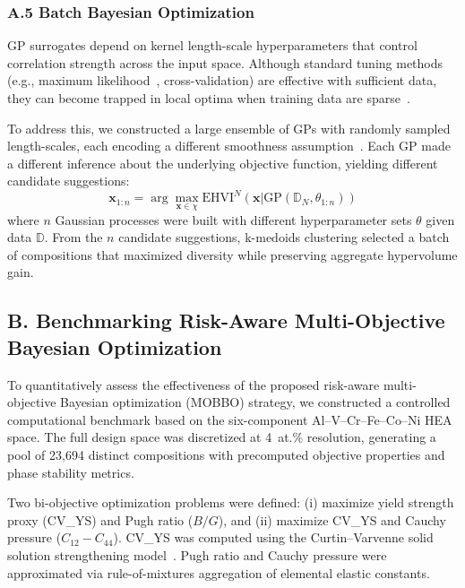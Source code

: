 \documentclass[preprint,12pt,times]{elsarticle}  %
\begin{document}
\subsubsection*{A.5 Batch Bayesian Optimization}

GP surrogates depend on kernel length-scale hyperparameters that control correlation strength across the input space. Although standard tuning methods (e.g., maximum likelihood~\cite{Rasmussen:2005:GPM:1162254}, cross-validation) are effective with sufficient data, they can become trapped in local optima when training data are sparse~\cite{joy2020batch,couperthwaite2020materials}.

To address this, we constructed a large ensemble of GPs with randomly sampled length-scales, each encoding a different smoothness assumption~\cite{joy2020batch}. Each GP made a different inference about the underlying objective function, yielding different candidate suggestions:
\begin{equation}
    \textbf{x}_{1:n} = \arg\max_{\mathbf{x} \in \chi}  \textrm{EHVI}^{N}(\textbf{x} | \textrm{GP}(\mathbb{D}_N,\theta_{1:n}))
\end{equation}
where $n$ Gaussian processes were built with different hyperparameter sets $\theta$ given data $\mathbb{D}$. From the $n$ candidate suggestions, k-medoids clustering selected a batch of compositions that maximized diversity while preserving aggregate hypervolume gain.

\subsection*{B. Benchmarking Risk-Aware Multi-Objective Bayesian Optimization}
\label{sec:appendix_benchmark}

To quantitatively assess the effectiveness of the proposed risk-aware multi-objective Bayesian optimization (MOBBO) strategy, we constructed a controlled computational benchmark based on the six-component Al--V--Cr--Fe--Co--Ni HEA space. The full design space was discretized at 4~at.\% resolution, generating a pool of 23{,}694 distinct compositions with precomputed objective properties and phase stability metrics.

Two bi-objective optimization problems were defined:
(i) maximize yield strength proxy (CV\_YS) and Pugh ratio ($B/G$), and
(ii) maximize CV\_YS and Cauchy pressure ($C_{12} - C_{44}$).
CV\_YS was computed using the Curtin--Varvenne solid solution strengthening model~\cite{varvenne2016theory}. Pugh ratio and Cauchy pressure were approximated via rule-of-mixtures aggregation of elemental elastic constants.
\end{document}
